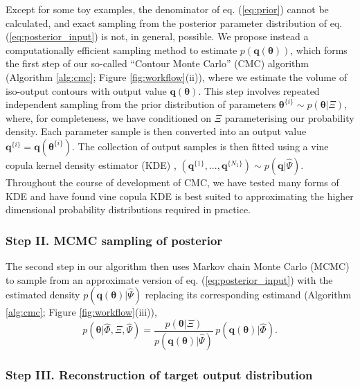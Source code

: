 Except for some toy examples, the denominator of eq. (\ref{eq:prior}) cannot be calculated, and exact sampling from the posterior parameter distribution of eq. (\ref{eq:posterior_input}) is not, in general, possible. We propose instead a computationally efficient sampling method to estimate $p(\boldsymbol{q}(\boldsymbol{\theta}))$, which forms the first step of our so-called ``Contour Monte Carlo'' (CMC) algorithm (Algorithm \ref{alg:cmc}; Figure \ref{fig:workflow}(ii)), where we estimate the volume of iso-output contours with output value $\boldsymbol{q}(\boldsymbol{\theta})$. This step involves repeated independent sampling from the prior distribution of parameters $\boldsymbol{\theta}^{\{i\}}\sim p(\boldsymbol{\theta}|\Xi)$, where, for completeness, we have conditioned on $\Xi$ parameterising our probability density. Each parameter sample is then converted into an output value $\boldsymbol{q}^{\{i\}}=\boldsymbol{q}(\boldsymbol{\theta}^{\{i\}})$. The collection of output samples is then fitted using a vine copula kernel density estimator (KDE) \cite{nagler2016evading}, $(\boldsymbol{q}^{\{1\}},...,\boldsymbol{q}^{\{N_1\}})\sim p({\boldsymbol{q}}|\hat{\Psi})$. Throughout the course of development of CMC, we have tested many forms of KDE and have found vine copula KDE is best suited to approximating the higher dimensional probability distributions required in practice.


\subsubsection{Step II. MCMC sampling of posterior}

The second step in our algorithm then uses Markov chain Monte Carlo (MCMC) to sample from an approximate version of eq. (\ref{eq:posterior_input}) with the estimated density $p(\boldsymbol{q}(\boldsymbol{\theta})|\hat{\Psi})$ replacing its corresponding estimand (Algorithm \ref{alg:cmc}; Figure \ref{fig:workflow}(iii)),
%
\begin{equation}\label{eq:posterior_input_estimated}
p(\boldsymbol{\theta}|\hat{\Phi},\Xi,\hat{\Psi}) =
\frac{p(\boldsymbol{\theta}|\Xi)}{p(\boldsymbol{q}(\boldsymbol{\theta})|\hat{\Psi})} \,
p(\boldsymbol{q}(\boldsymbol{\theta})|\hat{\Phi}).
\end{equation}
%

\subsubsection{Step III. Reconstruction of target output distribution}

